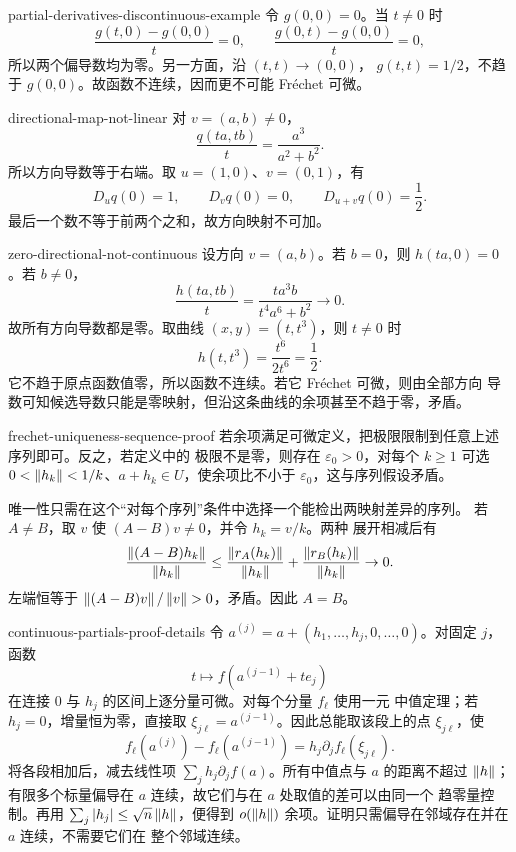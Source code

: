 \begin{solution}{partial-derivatives-discontinuous-example}
令 \(g(0,0)=0\)。当 \(t\ne0\) 时
\[
 \frac{g(t,0)-g(0,0)}t=0,
 \qquad
 \frac{g(0,t)-g(0,0)}t=0,
\]
所以两个偏导数均为零。另一方面，沿 \((t,t)\to(0,0)\)，
\(g(t,t)=1/2\)，不趋于 \(g(0,0)\)。故函数不连续，因而更不可能
Fréchet 可微。
\end{solution}

\begin{solution}{directional-map-not-linear}
对 \(v=(a,b)\ne0\)，
\[
 \frac{q(ta,tb)}t
 =\frac{a^3}{a^2+b^2}.
\]
所以方向导数等于右端。取 \(u=(1,0)\)、\(v=(0,1)\)，有
\[
 D_uq(0)=1,
 \qquad D_vq(0)=0,
 \qquad D_{u+v}q(0)=\frac12.
\]
最后一个数不等于前两个之和，故方向映射不可加。
\end{solution}

\begin{solution}{zero-directional-not-continuous}
设方向 \(v=(a,b)\)。若 \(b=0\)，则 \(h(ta,0)=0\)。若 \(b\ne0\)，
\[
 \frac{h(ta,tb)}t
 =\frac{t a^3b}{t^4a^6+b^2}\to0.
\]
故所有方向导数都是零。取曲线 \((x,y)=(t,t^3)\)，则 \(t\ne0\) 时
\[
 h(t,t^3)=\frac{t^6}{2t^6}=\frac12.
\]
它不趋于原点函数值零，所以函数不连续。若它 Fréchet 可微，则由全部方向
导数可知候选导数只能是零映射，但沿这条曲线的余项甚至不趋于零，矛盾。
\end{solution}

\begin{solution}{frechet-uniqueness-sequence-proof}
若余项满足可微定义，把极限限制到任意上述序列即可。反之，若定义中的
极限不是零，则存在 \(\varepsilon_0>0\)，对每个 \(k\ge1\) 可选
\(0<\left\lVert h_k\right\rVert<1/k\)、\(a+h_k\in U\)，使余项比不小于
\(\varepsilon_0\)，这与序列假设矛盾。

唯一性只需在这个“对每个序列”条件中选择一个能检出两映射差异的序列。
若 \(A\ne B\)，取 \(v\) 使 \((A-B)v\ne0\)，并令 \(h_k=v/k\)。两种
展开相减后有
\[
 \frac{\left\lVert(A-B)h_k\right\rVert}{\left\lVert h_k\right\rVert}
 \le
 \frac{\left\lVert r_A(h_k)\right\rVert}{\left\lVert h_k\right\rVert}
 +\frac{\left\lVert r_B(h_k)\right\rVert}{\left\lVert h_k\right\rVert}\to0.
\]
左端恒等于 \(\left\lVert(A-B)v\right\rVert/\left\lVert v\right\rVert>0\)，矛盾。因此 \(A=B\)。
\end{solution}

\begin{solution}{continuous-partials-proof-details}
令
\(a^{(j)}=a+(h_1,\ldots,h_j,0,\ldots,0)\)。对固定 \(j\)，函数
\[
 t\longmapsto f(a^{(j-1)}+te_j)
\]
在连接 $0$ 与 $h_j$ 的区间上逐分量可微。对每个分量 $f_\ell$ 使用一元
中值定理；若 $h_j=0$，增量恒为零，直接取
$\xi_{j\ell}=a^{(j-1)}$。因此总能取该段上的点 $\xi_{j\ell}$，使
\[
 f_\ell(a^{(j)})-f_\ell(a^{(j-1)})
 =h_j\partial_jf_\ell(\xi_{j\ell}).
\]
将各段相加后，减去线性项
$\sum_jh_j\partial_jf(a)$。所有中值点与 $a$ 的距离不超过 $\left\lVert h\right\rVert$；
有限多个标量偏导在 $a$ 连续，故它们与在 $a$ 处取值的差可以由同一个
趋零量控制。再用 $\sum_j|h_j|\le\sqrt n\left\lVert h\right\rVert$，便得到
$o(\left\lVert h\right\rVert)$ 余项。证明只需偏导在邻域存在并在 $a$ 连续，不需要它们在
整个邻域连续。
\end{solution}


